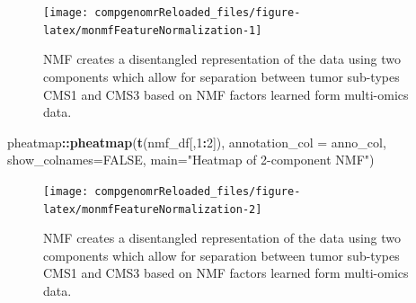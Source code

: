 \documentclass[12pt,]{krantz}
\newenvironment{Shaded}{\begin{snugshade}}{\end{snugshade}}
\newcommand{\DataTypeTok}[1]{\textcolor[rgb]{0.13,0.29,0.53}{#1}}
\newcommand{\DecValTok}[1]{\textcolor[rgb]{0.00,0.00,0.81}{#1}}
\newcommand{\KeywordTok}[1]{\textcolor[rgb]{0.13,0.29,0.53}{\textbf{#1}}}
\newcommand{\NormalTok}[1]{#1}
\newcommand{\OperatorTok}[1]{\textcolor[rgb]{0.81,0.36,0.00}{\textbf{#1}}}
\newcommand{\OtherTok}[1]{\textcolor[rgb]{0.56,0.35,0.01}{#1}}
\newcommand{\StringTok}[1]{\textcolor[rgb]{0.31,0.60,0.02}{#1}}
\begin{document}
\begin{Shaded}
\end{Shaded}

\begin{figure}

{\centering \texttt{[image: compgenomrReloaded\_files/figure-latex/monmfFeatureNormalization-1]} 

}

\caption{NMF creates a disentangled representation of the data using two components which allow for separation between tumor sub-types CMS1 and CMS3 based on NMF factors learned form multi-omics data.}\label{fig:monmfFeatureNormalization1}
\end{figure}

\begin{Shaded}
\begin{Highlighting}[]
\NormalTok{pheatmap}\OperatorTok{::}\KeywordTok{pheatmap}\NormalTok{(}\KeywordTok{t}\NormalTok{(nmf_df[,}\DecValTok{1}\OperatorTok{:}\DecValTok{2}\NormalTok{]), }\DataTypeTok{annotation_col =}\NormalTok{ anno_col, }\DataTypeTok{show_colnames=}\OtherTok{FALSE}\NormalTok{, }\DataTypeTok{main=}\StringTok{"Heatmap of 2-component NMF"}\NormalTok{)}
\end{Highlighting}
\end{Shaded}

\begin{figure}

{\centering \texttt{[image: compgenomrReloaded\_files/figure-latex/monmfFeatureNormalization-2]} 

}

\caption{NMF creates a disentangled representation of the data using two components which allow for separation between tumor sub-types CMS1 and CMS3 based on NMF factors learned form multi-omics data.}\label{fig:monmfFeatureNormalization2}
\end{figure}
\end{document}
